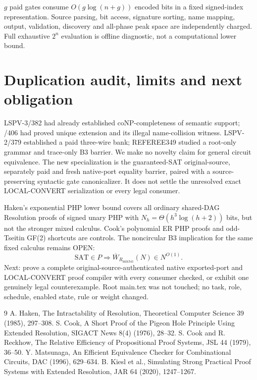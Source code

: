 \documentclass[11pt]{article}
\begin{document}
$g$ paid gates consume $O(g\log(n+g))$ encoded bits in a fixed signed-index representation. Source parsing, bit access, signature sorting, name mapping, output, validation, discovery and all-phase peak space are independently charged. Full exhaustive $2^n$ evaluation is offline diagnostic, not a computational lower bound.

\section*{Duplication audit, limits and next obligation}
LSPV-3/382 had already established coNP-completeness of semantic support; /406 had proved unique extension and its illegal name-collision witness. LSPV-2/379 established a paid three-wire bank; REFEREE349 studied a root-only grammar and trace-only B3 barrier. We make no novelty claim for general circuit equivalence. The new specialization is the guaranteed-SAT original-source, separately paid and fresh native-port equality barrier, paired with a source-preserving syntactic gate canonicalizer. It does not settle the unresolved exact LOCAL-CONVERT serialization or every legal consumer.

Haken's exponential PHP lower bound covers all ordinary shared-DAG Resolution proofs of signed unary PHP with $N_h=\Theta(h^3\log(h+2))$ bits, but not the stronger mixed calculus. Cook's polynomial ER PHP proofs and odd-Tseitin GF(2) shortcuts are controls. The noncircular B3 implication for the same fixed calculus remains OPEN:
\[
 \mathrm{SAT}\in P\Longrightarrow
 \overline W_{R_{\mathrm{mix341}}}(N)\in N^{O(1)}.
\]
Next: prove a complete original-source-authenticated native exported-port and LOCAL-CONVERT proof compiler with every consumer checked, or exhibit one genuinely legal counterexample. Root main.tex was not touched; no task, role, schedule, enabled state, rule or weight changed.

\begin{thebibliography}{9}
 A. Haken, The Intractability of Resolution, Theoretical Computer Science 39 (1985), 297--308.
 S. Cook, A Short Proof of the Pigeon Hole Principle Using Extended Resolution, SIGACT News 8(4) (1976), 28--32.
 S. Cook and R. Reckhow, The Relative Efficiency of Propositional Proof Systems, JSL 44 (1979), 36--50.
 Y. Matsunaga, An Efficient Equivalence Checker for Combinational Circuits, DAC (1996), 629--634.
 B. Kiesl et al., Simulating Strong Practical Proof Systems with Extended Resolution, JAR 64 (2020), 1247--1267.
\end{thebibliography}
\end{document}
